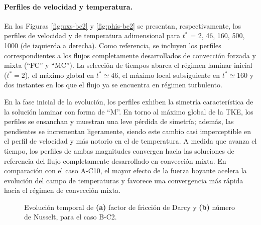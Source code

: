 \paragraph{Perfiles de velocidad y temperatura.}
En las Figuras \ref{fig:uxs-bc2} y \ref{fig:phis-bc2} se presentan, respectivamente, los perfiles de velocidad y de temperatura adimensional para $t^*$ = 2, 46, 160, 500, 1000 (de izquierda a derecha). Como referencia, se incluyen los perfiles correspondientes a los flujos completamente desarrollados de convección forzada y mixta (``FC'' y ``MC''). La selección de tiempos abarca el régimen laminar inicial ($t^* = 2$), el máximo global en $t^* \simeq 46$, el máximo local subsiguiente en $t^* \simeq 160$ y dos instantes en los que el flujo ya se encuentra en régimen turbulento.

En la fase inicial de la evolución, los perfiles exhiben la simetría característica de la solución laminar con forma de ``M''. En torno al máximo global de la TKE, los perfiles se ensanchan y muestran una leve pérdida de simetría; además, las pendientes se incrementan ligeramente, siendo este cambio casi imperceptible en el perfil de velocidad y más notorio en el de temperatura. A medida que avanza el tiempo, los perfiles de ambas magnitudes convergen hacia las soluciones de referencia del flujo completamente desarrollado en convección mixta. En comparación con el caso A-C10, el mayor efecto de la fuerza boyante acelera la evolución del campo de temperaturas y favorece una convergencia más rápida hacia el régimen de convección mixta.


\begin{figure}[H]
  \centering  
  
  \caption{Evolución temporal de \textbf{(a)} factor de fricción de Darcy y \textbf{(b)} número de Nusselt, para el caso B-C2.}
    \label{fig:mosaico-bc2}
\end{figure}

